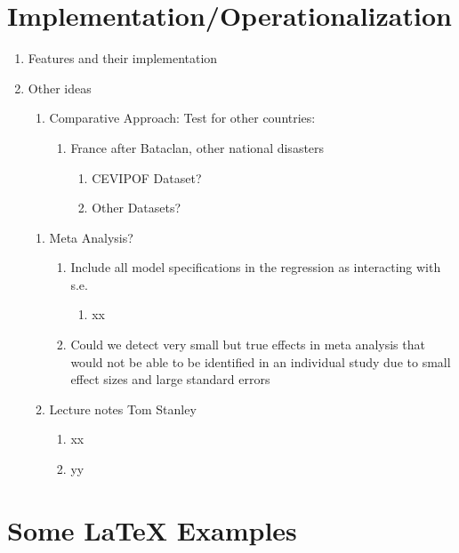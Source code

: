 \documentclass[a4paper,man,natbib]{apa6}
\begin{document}
\section{Implementation/Operationalization}
\label{sec:Implementation/Operationalization}

\begin{enumerate}
	\item Features and their implementation

	 


	\item Other ideas
	\begin{enumerate}
		\item Comparative Approach: Test for other countries: 
		\begin{enumerate}
			\item France after Bataclan, other national disasters
			\begin{enumerate}
				\item CEVIPOF Dataset?
				\item Other Datasets?
			\end{enumerate}
		\end{enumerate}
	\end{enumerate}
	\begin{enumerate}
		\item Meta Analysis?
		\begin{enumerate}
			\item Include all model specifications in the regression as interacting with s.e.
			\begin{enumerate}
				\item xx
			\end{enumerate}
			\item Could we detect very small but true effects in meta analysis that would not be able to be identified in an individual study due to small effect sizes and large standard errors
		\end{enumerate}
		\item Lecture notes Tom Stanley
		\begin{enumerate}
			\item xx
			\item yy 
		\end{enumerate}
	\end{enumerate}
\end{enumerate}


\section{Some \LaTeX{} Examples}
\label{sec:examples}
\end{document}
